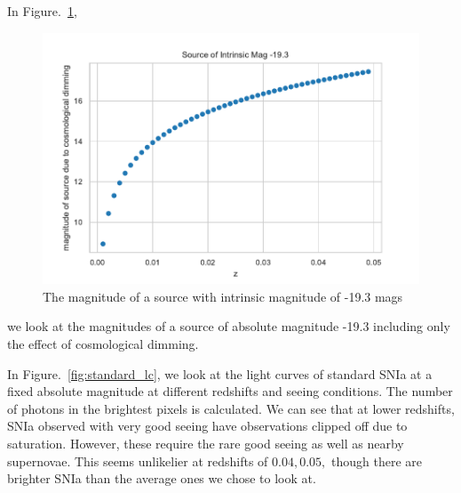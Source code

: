 \documentclass[\docopts]{\docclass}
\begin{document}
In Figure.~\ref{fig:hubble},
\begin{figure}
\includegraphics[width=0.9\columnwidth]{HubbleDiag}
\caption{The magnitude of a source with intrinsic magnitude of -19.3 mags\label{fig:hubble}}
\end{figure}
we look at the magnitudes of a source of absolute magnitude -19.3 including only the effect of cosmological dimming.


In Figure.~\ref{fig:standard_lc}, we look at the light curves of standard SNIa at a fixed absolute magnitude at different redshifts and seeing conditions. The number of photons in the brightest pixels is calculated. We can see that at lower redshifts, SNIa observed with very good seeing have observations clipped off due to saturation. However, these require the rare good seeing as well as nearby supernovae. This seems unlikelier at redshifts of $0.04, 0.05,$ though there are brighter SNIa than the average ones we chose to look at.
\end{document}
